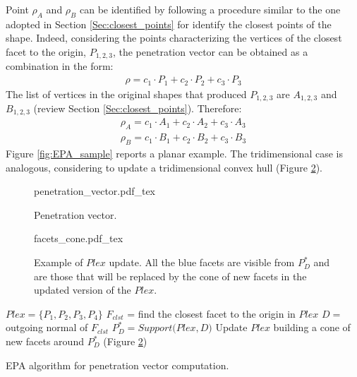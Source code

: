 \documentclass{article}
\begin{document}
Point $\rho_A$ and $\rho_B$ can be identified by following a procedure similar to the one adopted in Section \ref{Sec:closest_points} for identify the closest points of the shape. Indeed, considering the points characterizing the vertices of the closest facet to the origin, $P_{1,2,3}$, the penetration vector can be obtained as a combination in the form:
\begin{eqnarray}
\rho = c_1 \cdot P_1 + c_2 \cdot P_2 +  c_3 \cdot P_3 
\end{eqnarray}
The list of vertices in the original shapes that produced $P_{1,2,3}$ are $A_{1,2,3}$ and $B_{1,2,3}$ (review Section \ref{Sec:closest_points}). Therefore:
\begin{eqnarray}
\rho_A =  c_1 \cdot A_1 + c_2 \cdot A_2 +  c_3 \cdot A_3  \nonumber\\
\rho_B =  c_1 \cdot B_1 + c_2 \cdot B_2 +  c_3 \cdot B_3
\end{eqnarray}
Figure \ref{fig:EPA_sample} reports a planar example. The tridimensional case is analogous, considering to update a tridimensional convex hull (Figure \ref{fig:face_cone}).

\begin{figure}
	\centering
\def\svgwidth{0.85 \columnwidth}
{penetration_vector.pdf_tex} 
	\caption{Penetration vector. }
	\label{fig:penetration_vector}
\end{figure}

\begin{figure}
	\centering
\def\svgwidth{0.7 \columnwidth}
{facets_cone.pdf_tex} 
	\caption{Example of $Plex$ update. All the blue facets are visible from $P^*_D$ and are those that will be replaced by the cone of new facets in the updated version of the $Plex$.  }
	\label{fig:face_cone}
\end{figure}

\begin{algorithm}[H]
 $Plex = \lbrace P_1, P_2, P_3, P_4 \rbrace$\;
 $F_{clst}$ = find the closest facet to the origin in $Plex$\;
 $D =$ outgoing normal of $F_{clst}$\;
 $P^*_D=Support\bigg(Plex , D\bigg)$\;
 Update $Plex$ building a cone of new facets around $P^*_D$ (Figure \ref{fig:face_cone})\;
\caption{EPA algorithm for penetration vector computation.
\label{alg:EPA}}
\end{algorithm}
\end{document}
